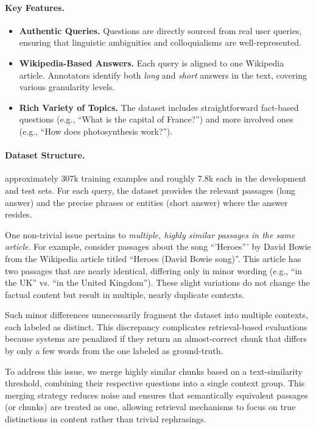 \paragraph{Key Features.}
\begin{itemize}
    \item \textbf{Authentic Queries.} Questions are directly sourced from real user queries, 
          ensuring that linguistic ambiguities and colloquialisms are well-represented.
    \item \textbf{Wikipedia-Based Answers.} Each query is aligned to one Wikipedia article. 
          Annotators identify both \emph{long} and \emph{short} answers in the text, covering various granularity levels.
    \item \textbf{Rich Variety of Topics.} The dataset includes straightforward fact-based questions 
          (e.g., “What is the capital of France?”) and more involved ones (e.g., “How does photosynthesis work?”).
\end{itemize}

\paragraph{Dataset Structure.}
\fi
approximately 307k training examples and roughly 7.8k each in the development and test sets. 
For each query, the dataset provides the relevant passages (long answer) and the precise phrases or entities (short answer) 
where the answer resides.

One non-trivial issue pertains to {\it multiple, highly similar passages 
in the same article}.
For example, consider passages about the song ``'Heroes''' by David Bowie from the Wikipedia article titled ``Heroes (David Bowie song)''. This article has two passages that
are nearly identical, differing only in minor wording (e.g., “in the UK” vs. “in the United Kingdom”). These slight variations do not change the factual content but result in multiple, nearly duplicate contexts.

Such minor differences unnecessarily fragment the dataset into multiple contexts, each labeled as distinct. This discrepancy complicates retrieval-based evaluations because systems are penalized if they return an almost-correct chunk that differs by only a few words from the one labeled as ground-truth.

To address this issue, we merge highly similar chunks based on a text-similarity threshold, combining their respective questions into a single context group. This merging strategy reduces noise and ensures that semantically equivalent passages (or chunks) are treated as one, allowing retrieval mechanisms to focus on true distinctions in content rather than trivial rephrasings.

